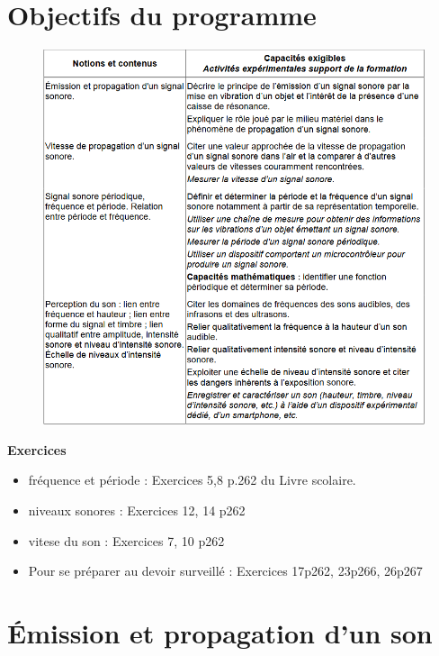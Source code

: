 \documentclass[french]{article}
\begin{document}
\section*{Objectifs du programme}
\begin{figure}[!ht]
	\centering
	\includegraphics[width=1\textwidth]{./figures/BO.png}
\end{figure}

\begin{mdframed}[style=doc, leftmargin=0pt, rightmargin=0pt, innertopmargin=8pt, innerbottommargin=8pt, innerrightmargin=10pt, innerleftmargin=10pt]
		\noindent\textbf{Exercices}\medskip

		\begin{itemize}
			\item fréquence et période : Exercices 5,8 p.262 du Livre scolaire.
			\item niveaux sonores : Exercices 12, 14 p262
			\item vitese du son : Exercices  7, 10 p262
			\item Pour se préparer au devoir surveillé : Exercices 17p262, 23p266, 26p267
			
		\end{itemize}
\end{mdframed}
\clearpage
\section{Émission et propagation d'un son}
\end{document}
